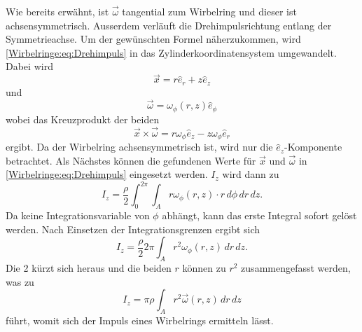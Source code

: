 Wie bereits erwähnt, ist \(\vec{\omega}\) tangential zum Wirbelring und dieser ist achsensymmetrisch.
Ausserdem verläuft die Drehimpulsrichtung entlang der Symmetrieachse.
Um der gewünschten Formel näherzukommen, wird \eqref{Wirbelringe:eq:Drehimpuls} in das Zylinderkoordinatensystem umgewandelt.
Dabei wird
\begin{equation*}
    \vec{x}
    =
    r\hat{e}_r + z\hat{e}_z
\end{equation*}
und
\begin{equation*}
    \vec{\omega}
    =
    \omega_\phi(r,z)\hat{e}_\phi
\end{equation*}
wobei das Kreuzprodukt der beiden 
\begin{equation*}
    \vec{x}\times\vec{\omega}
    =
    r\omega_\phi\hat{e}_z - z\omega_\phi\hat{e}_r
\end{equation*}
ergibt. 
Da der Wirbelring achsensymmetrisch ist, wird nur die \(\hat{e}_z\)-Komponente betrachtet.
Als Nächstes können die gefundenen Werte für \(\vec{x}\) und \(\vec{\omega}\) in \eqref{Wirbelringe:eq:Drehimpuls} eingesetzt werden.
\(I_z\) wird dann zu
\begin{equation*}
    I_z
    =
    \frac{\rho}{2}\int_{0}^{2\pi}\int_{A}r\omega_\phi(r,z)\cdot r\,d\phi \,dr\,dz.
\end{equation*}
Da keine Integrationsvariable von \(\phi\) abhängt, kann das erste Integral sofort gelöst werden. 
Nach Einsetzen der Integrationsgrenzen ergibt sich
\begin{equation*}
    I_z
    =
    \frac{\rho}{2}2\pi\int_{A}r^2\omega_\phi(r,z)\,dr\,dz.
\end{equation*}
Die 2 kürzt sich heraus und die beiden \(r\) können zu \(r^2\) zusammengefasst werden, was zu
\begin{equation}
    I_z
    =
    \pi\rho\int_{A}r^2\vec{\omega}(r,z)\,dr\,dz
    \label{Wirbelringe:eq:achssymImp}
\end{equation}
führt, womit sich der Impuls eines Wirbelrings ermitteln lässt.

